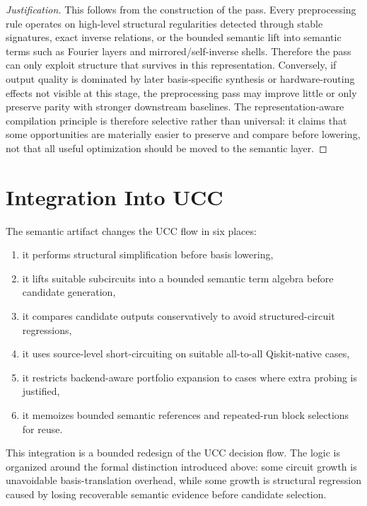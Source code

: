 \documentclass[11pt]{article}
\begin{document}
\begin{proof}[Justification]
This follows from the construction of the pass. Every preprocessing rule
operates on high-level structural regularities detected through stable
signatures, exact inverse relations, or the bounded semantic lift into semantic
terms such as Fourier layers and mirrored/self-inverse shells. Therefore the
pass can only exploit structure that survives in this representation.
Conversely, if output quality is dominated by later basis-specific synthesis or
hardware-routing effects not visible at this stage, the preprocessing pass may
improve little or only preserve parity with stronger downstream baselines. The
representation-aware compilation principle is therefore selective rather than
universal: it claims that some opportunities are materially easier to preserve
and compare before lowering, not that all useful optimization should be moved
to the semantic layer.
\end{proof}

\section{Integration Into UCC}
\label{sec:integration}

The semantic artifact changes the UCC flow in six places:
\begin{enumerate}[leftmargin=1.5em]
    \item it performs structural simplification before basis lowering,
    \item it lifts suitable subcircuits into a bounded semantic term algebra before candidate generation,
    \item it compares candidate outputs conservatively to avoid structured-circuit regressions,
    \item it uses source-level short-circuiting on suitable all-to-all Qiskit-native cases,
    \item it restricts backend-aware portfolio expansion to cases where extra probing is justified,
    \item it memoizes bounded semantic references and repeated-run block selections for reuse.
\end{enumerate}

This integration is a bounded redesign of the UCC decision flow. The logic is
organized around the formal distinction introduced above: some circuit growth is
unavoidable basis-translation overhead, while some growth is structural
regression caused by losing recoverable semantic evidence before candidate
selection.
\end{document}
